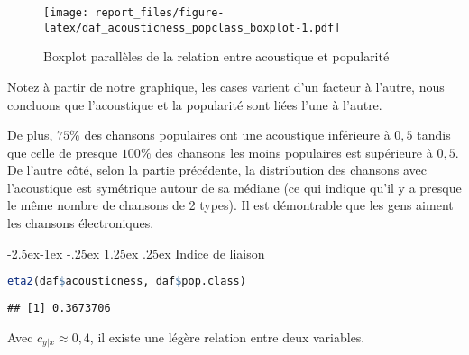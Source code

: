 \documentclass[
  12pt,
  xcolor = usenames,dvipsnames]{article}
\makeatletter
\renewcommand\paragraph{\@startsection{paragraph}{4}{\z@}%
        {-2.5ex\@plus -1ex \@minus -.25ex}%
        {1.25ex \@plus .25ex}%
        {\normalfont\normalsize\bfseries}}
\makeatother
\begin{document}
\begin{figure}
\centering
\texttt{[image: report\_files/figure-latex/daf\_acousticness\_popclass\_boxplot-1.pdf]}
\caption{Boxplot parallèles de la relation entre acoustique et
popularité}
\end{figure}

Notez à partir de notre graphique, les cases varient d'un facteur à
l'autre, nous concluons que l'acoustique et la popularité sont liées
l'une à l'autre.

De plus, \(75\%\) des chansons populaires ont une acoustique inférieure
à \(0,5\) tandis que celle de presque \(100\%\) des chansons les moins
populaires est supérieure à \(0,5\). De l'autre côté, selon la partie
précédente, la distribution des chansons avec l'acoustique est
symétrique autour de sa médiane (ce qui indique qu'il y a presque le
même nombre de chansons de 2 types). Il est démontrable que les gens
aiment les chansons électroniques.

\hypertarget{indice-de-liaison}{%
\paragraph{Indice de liaison}\label{indice-de-liaison}}

\begin{lstlisting}[language=R]
eta2(daf$acousticness, daf$pop.class)
\end{lstlisting}

\begin{lstlisting}
## [1] 0.3673706
\end{lstlisting}

Avec \(c_{y|x} \approx 0,4\), il existe une légère relation entre deux
variables.
\end{document}

